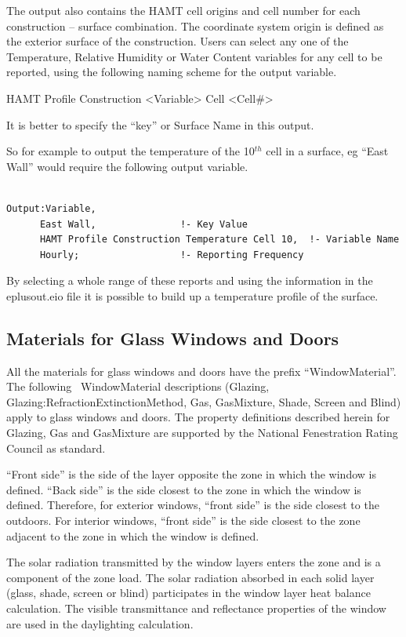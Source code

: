 The output also contains the HAMT cell origins and cell number for each construction -- surface combination. The coordinate system origin is defined as the exterior surface of the construction. Users can select any one of the Temperature, Relative Humidity or Water Content variables for any cell to be reported, using the following naming scheme for the output variable.

HAMT Profile Construction \textless{}Variable\textgreater{} Cell \textless{}Cell\#\textgreater{}

It is better to specify the ``key'' or Surface Name in this output.

So for example to output the temperature of the 10\(^{th}\) cell in a surface, eg ``East Wall'' would require the following output variable.

\begin{lstlisting}

Output:Variable,
      East Wall,               !- Key Value
      HAMT Profile Construction Temperature Cell 10,  !- Variable Name
      Hourly;                  !- Reporting Frequency
\end{lstlisting}

By selecting a whole range of these reports and using the information in the eplusout.eio file it is possible to build up a temperature profile of the surface.

\subsection{Materials for Glass Windows and Doors}\label{materials-for-glass-windows-and-doors}

All the materials for glass windows and doors have the prefix ``WindowMaterial''. The following~ WindowMaterial descriptions (Glazing, Glazing:RefractionExtinctionMethod, Gas, GasMixture, Shade, Screen and Blind) apply to glass windows and doors. The property definitions described herein for Glazing, Gas and GasMixture are supported by the National Fenestration Rating Council as standard.

``Front side'' is the side of the layer opposite the zone in which the window is defined. ``Back side'' is the side closest to the zone in which the window is defined. Therefore, for exterior windows, ``front side'' is the side closest to the outdoors. For interior windows, ``front side'' is the side closest to the zone adjacent to the zone in which the window is defined.

The solar radiation transmitted by the window layers enters the zone and is a component of the zone load. The solar radiation absorbed in each solid layer (glass, shade, screen or blind) participates in the window layer heat balance calculation. The visible transmittance and reflectance properties of the window are used in the daylighting calculation.

